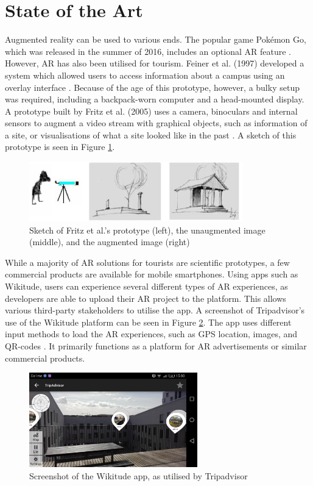 \section{State of the Art}
Augmented reality can be used to various ends. The popular game Pokémon Go, which was released in the summer of 2016, includes an optional AR feature \cite{Pokemon}. However, AR has also been utilised for tourism. Feiner et al. (1997) developed a system which allowed users to access information about a campus using an overlay interface \cite{Feiner1997}. Because of the age of this prototype, however, a bulky setup was required, including a backpack-worn computer and a head-mounted display. A prototype built by Fritz et al. (2005) uses a camera, binoculars and internal sensors to augment a video stream with graphical objects, such as information of a site, or visualisations of what a site looked like in the past \cite{Fritz2005}. A sketch of this prototype is seen in Figure \ref{fig:binoculars}.

\begin{figure}[h!]
    \centering
    \includegraphics[scale=0.7]{figures/binoc.png}
    \caption{Sketch of Fritz et al.'s prototype (left), the unaugmented image (middle), and the augmented image (right) \cite{Fritz2005}}\label{fig:binoculars}
\end{figure}

While a majority of AR solutions for tourists are scientific prototypes, a few commercial products are available for mobile smartphones. Using apps such as Wikitude, users can experience several different types of AR experiences, as developers are able to upload their AR project to the platform. This allows various third-party stakeholders to utilise the app. A screenshot of Tripadvisor's use of the Wikitude platform can be seen in Figure \ref{fig:wikitude}. The app uses different input methods to load the AR experiences, such as GPS location, images, and QR-codes \cite{Wikitude}. It primarily functions as a platform for AR advertisements or similar commercial products.

\begin{figure}[h!]
    \centering
    \includegraphics[width=0.65\textwidth]{figures/wikitude.png}
    \caption{Screenshot of the Wikitude app, as utilised by Tripadvisor}\label{fig:wikitude}
\end{figure}


